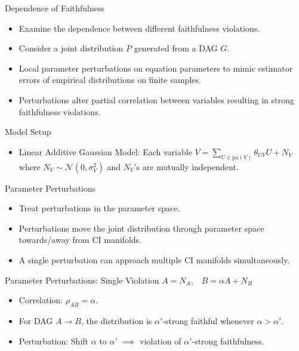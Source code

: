 \documentclass{beamer}
\begin{document}
\begin{frame}{Dependence of Faithfulness}
	\begin{itemize}
		\item Examine the dependence between different faithfulness violations.
		\item Consider a joint distribution $ P $ generated from a DAG $ G $. 
		\item Local parameter perturbations on equation parameters to mimic estimator errors of empirical distributions on finite samples.
		\item Perturbations alter partial correlation between variables resulting in strong faithfulness violations.

	\end{itemize}
\end{frame}

\begin{frame}{Model Setup}
	\begin{itemize}
		\item Linear Additive Gaussian Model: Each variable $V = \sum_{U\in\text{pa}(V)} \theta_{UV}U + N_V$ where $N_V \sim \mathcal N(0,\sigma_V^2)$ and $N_V$’s are mutually independent.
	\end{itemize}
\end{frame}

\begin{frame}{Parameter Perturbations}
	\begin{itemize}
		\item Treat perturbations in the parameter space.
		\item Perturbations move the joint distribution through parameter space towards/away from CI manifolds.
		\item A single perturbation can approach multiple CI manifolds simultaneously.
	\end{itemize}
\end{frame}

\begin{frame}{Parameter Perturbations: Single Violation}
	$ A = N_A, \;\;\; B = \alpha A + N_B $
	\begin{itemize}
		\item Correlation: $ \rho_{AB} = \alpha $.
		\item For DAG $ A \rightarrow B $, the distribution is $ \alpha'$-strong faithful whenever $ \alpha > \alpha' $.
		\item Perturbation: Shift $ \alpha $ to $ \alpha' $ $ \implies $ violation of $ \alpha'$-strong faithfulness.
	\end{itemize}
\end{frame}
\end{document}

